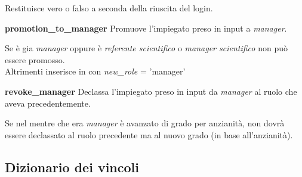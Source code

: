 Restituisce vero o falso a seconda della riuscita del login.
\bigskip

\noindent \textbf{promotion\_to\_manager}\sskip
Promuove l'impiegato preso in input a \textit{manager}.

Se è gia \textit{manager} oppure è \textit{referente scientifico} o \textit{manager scientifico} non può essere promosso. \\
Altrimenti inserisce in \textit{\careerlog} con \textit{new\_role} = 'manager'
\bigskip

\noindent \textbf{revoke\_manager}\sskip
Declassa l'impiegato preso in input da \textit{manager} al ruolo che aveva precedentemente.

Se nel mentre che era \textit{manager} è avanzato di grado per anzianità, non dovrà essere declassato al ruolo precedente ma al nuovo grado (in base all'anzianità).


\subsection{Dizionario dei vincoli}

